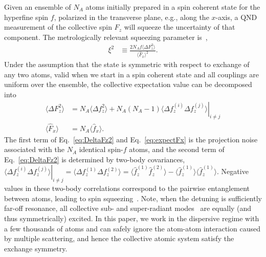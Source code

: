 \documentclass[aps,pra,twocolumn,superscriptaddress]{revtex4-1} %
\newcommand{\expect}[1]{\big\langle #1 \big\rangle}
\begin{document}
Given an ensemble of $N_A$ atoms initially prepared in a spin coherent state for the hyperfine spin $f$, polarized in the transverse plane, e.g., along the $x$-axis, a QND measurement of the collective spin  $F_z$ will squeeze the uncertainty of that component.  The metrologically relevant squeezing parameter is~\cite{Wineland1992},
\begin{align}\label{eq:xi2Faraday}
\xi^2 &\equiv  \frac{2 N_A f\expect{\Delta F_z ^2}}{\expect{\hat{F}_x}^2}.
\end{align}
Under the assumption that the state is symmetric with respect to exchange of any two atoms, valid when we start in a spin coherent state and all couplings are uniform over the ensemble, the collective expectation value can be decomposed into 
\begin{subequations}\label{eq:Ftof_squeezing}
\begin{align}
\expect{\!\Delta F_z^2} &= N_A \expect{\!\Delta f_z^2}\!+\!N_A(N_A\!-\!1)\left. \expect{\!\Delta\! f_z^{(i)}\Delta\! f_z^{(j)}}\right|_{i\!\neq\! j}\label{eq:DeltaFz2}\\
\expect{\hat{F}_x } & =N_A \expect{\hat{f}_x} \label{eq:expectFx}.
\end{align}
\end{subequations}
 The first term of Eq.~\eqref{eq:DeltaFz2} and Eq.~\eqref{eq:expectFx} is the projection noise associated with the  $N_A$ identical spin-$f$  atoms, and  the second term of Eq.~\eqref{eq:DeltaFz2} is determined by two-body covariances, $ \left.\expect{\Delta f_z^{(i)}\Delta f_z^{(j)}}\right|_{i\neq j}=\expect{\Delta f_z^{(1)}\Delta f_z^{(2)}} = \expect{\hat{f}_z^{(1)}\hat{f}_z^{(2)}}-\expect{\hat{f}_z^{(1)}} \expect{\hat{f}_z^{(1)}} $.  Negative values in these two-body correlations correspond to the pairwise entanglement between atoms, leading to spin squeezing~\cite{Wang2003Spin}.  Note, when the detuning is sufficiently far-off resonance, all collective sub- and super-radiant modes~\cite{Asenjo-Garcia2017Atom,Asenjo-Garcia2017Exponential} are equally (and thus symmetrically) excited.  In this paper, we work in the dispersive regime with a few thousands of atoms and can safely ignore the atom-atom interaction caused by multiple scattering, and hence the collective atomic system satisfy the exchange symmetry. 
\end{document}
